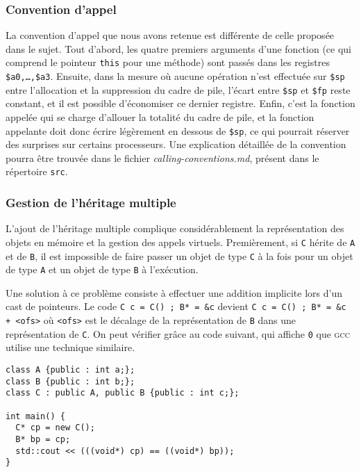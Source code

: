 \documentclass[11pt, a4paper]{article}
\newcommand{\prog}[1]{{\tt#1}}
\begin{document}
\subsubsection{Convention d'appel}
La convention d'appel que nous avons retenue est différente de celle proposée dans le sujet. Tout d'abord, les quatre premiers arguments d'une fonction (ce qui comprend le pointeur \prog{this} pour une méthode) sont passés dans les registres \prog{\$a0,\dots{},\$a3}. Ensuite, dans la mesure où aucune opération n'est effectuée sur \prog{\$sp} entre l'allocation et la suppression du cadre de pile, l'écart entre \prog{\$sp} et \prog{\$fp} reste constant, et il est possible d'économiser ce dernier registre. Enfin, c'est la fonction appelée qui se charge d'allouer la totalité du cadre de pile, et la fonction appelante doit donc écrire légèrement en dessous de \prog{\$sp}, ce qui pourrait réserver des surprises sur certains processeurs. Une explication détaillée de la convention pourra être trouvée dans le fichier \textit{calling-conventions.md}, présent dans le répertoire \prog{src}.

\subsubsection{Gestion de l'héritage multiple}
L'ajout de l'héritage multiple complique considérablement la représentation des objets en mémoire et la gestion des appels virtuels. Premièrement, si \prog{C} hérite de \prog{A} et de \prog{B}, il est impossible de faire passer un objet de type \prog{C} à la fois pour un objet de type \prog{A} et un objet de type \prog{B} à l'exécution.

Une solution à ce problème consiste à effectuer une addition implicite lors d'un cast de pointeurs. Le code \prog{C c = C() ; B* = \&c} devient \prog{C c = C() ; B* = \&c + <ofs>} où \prog{<ofs>} est le décalage de la représentation de \prog{B} dans une représentation de \prog{C}. On peut vérifier grâce au code suivant, qui affiche \prog{0} que \textsc{gcc} utilise une technique similaire.

\medskip
\lstset{language=C++}
\begin{footnotesize}

\begin {lstlisting}[basicstyle=\ttfamily, frame=lines] 
class A {public : int a;};
class B {public : int b;};
class C : public A, public B {public : int c;};

int main() {
  C* cp = new C();
  B* bp = cp;
  std::cout << (((void*) cp) == ((void*) bp));
}

\end{lstlisting}
\end{footnotesize}
\end{document}
